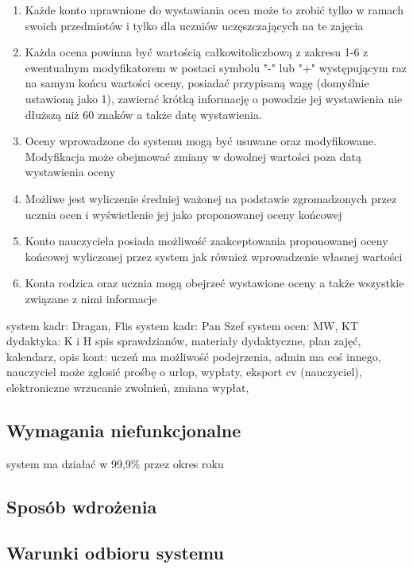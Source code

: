 \documentclass{article}
\begin{document}
\begin{enumerate}
    \item Każde konto uprawnione do wystawiania ocen może to zrobić tylko w ramach swoich przedmiotów i tylko dla uczniów uczęszczających na te zajęcia
    \item Każda ocena powinna być wartością całkowitoliczbową z zakresu 1-6 z ewentualnym modyfikatorem w postaci symbolu "-" lub "+" występującym raz na samym końcu wartości oceny, posiadać przypisaną wagę (domyślnie ustawioną jako 1), zawierać krótką informację o powodzie jej wystawienia nie dłuższą niż 60 znaków a także datę wystawienia.
    \item Oceny wprowadzone do systemu mogą być usuwane oraz modyfikowane. Modyfikacja może obejmować zmiany w dowolnej wartości poza datą wystawienia oceny
    \item Możliwe jest wyliczenie średniej ważonej na podstawie zgromadzonych przez ucznia ocen i wyświetlenie jej jako proponowanej oceny końcowej
    \item Konto nauczyciela posiada możliwość zaakceptowania proponowanej oceny końcowej wyliczonej przez system jak również wprowadzenie własnej wartości
    \item Konta rodzica oraz ucznia mogą obejrzeć wystawione oceny a także wszystkie związane z nimi informacje
\end{enumerate}
system kadr: Dragan, Flis
system kadr: Pan Szef
system ocen: MW, KT
dydaktyka: K i H spis sprawdzianów, materiały dydaktyczne, plan zajęć, kalendarz, opis kont: uczeń ma możliwość podejrzenia, admin ma coś innego, nauczyciel może zgłosić prośbę o urlop, wypłaty, eksport cv (nauczyciel), elektroniczne wrzucanie zwolnień, zmiana wypłat, 


\subsection{Wymagania niefunkcjonalne}
system ma działać w 99,9\% przez okres roku

\subsection{Sposób wdrożenia}

\subsection{Warunki odbioru systemu}
\end{document}
